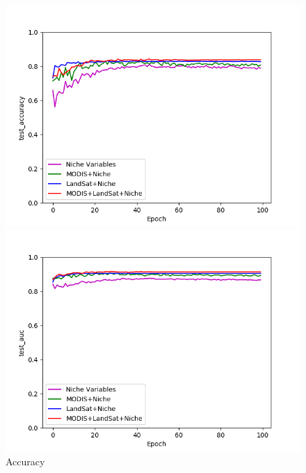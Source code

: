 \def\year{2017}\relax \documentclass[letterpaper]{article}
\begin{document}
\begin{figure}
\centering
\begin{minipage}{.24\textwidth}
  \centering
\includegraphics[width=\textwidth]{pics/test_accuracy_variables.png}
\caption{Accuracy}\label{fig:subsetacc}
\end{minipage}
\begin{minipage}{.01\textwidth}
\end{minipage}
\begin{minipage}{.24\textwidth}
  \centering
\includegraphics[width=\textwidth]{pics/test_auc_variables.png}

\end{minipage}
\end{figure}
\end{document}
